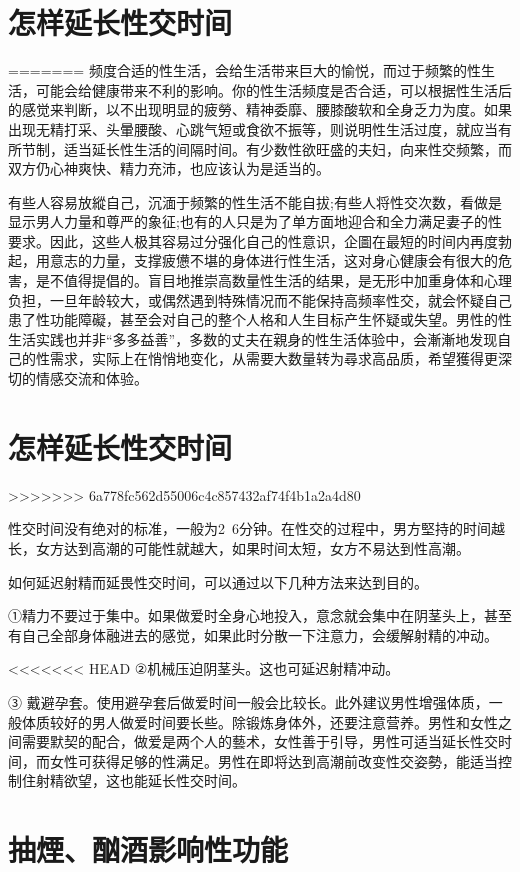 \documentclass[12pt,UTF8]{ctexbook}
\begin{document}
\section{怎样延长性交时间}
=======
频度合适的性生活，会给生活带来巨大的愉悦，而过于频繁的性生活，可能会给健康带来不利的影响。你的性生活频度是否合适，可以根据性生活后的感觉来判断，以不出现明显的疲勞、精神委靡、腰膝酸软和全身乏力为度。如果出现无精打采、头暈腰酸、心跳气短或食欲不振等，则说明性生活过度，就应当有所节制，适当延长性生活的间隔时间。有少数性欲旺盛的夫妇，向来性交频繁，而双方仍心神爽快、精力充沛，也应该认为是适当的。

有些人容易放縱自己，沉湎于频繁的性生活不能自拔;有些人将性交次数，看做是显示男人力量和尊严的象征;也有的人只是为了单方面地迎合和全力满足妻子的性要求。因此，这些人极其容易过分强化自己的性意识，企圖在最短的时间内再度勃起，用意志的力量，支撑疲憊不堪的身体进行性生活，这对身心健康会有很大的危害，是不值得提倡的。盲目地推崇高数量性生活的结果，是无形中加重身体和心理负担，一旦年龄较大，或偶然遇到特殊情况而不能保持高频率性交，就会怀疑自己患了性功能障礙，甚至会对自己的整个人格和人生目标产生怀疑或失望。男性的性生活实践也并非“多多益善”，多数的丈夫在親身的性生活体验中，会漸漸地发现自己的性需求，实际上在悄悄地变化，从需要大数量转为尋求高品质，希望獲得更深切的情感交流和体验。

\section{怎样延长性交时间}
>>>>>>> 6a778fc562d55006c4c857432af74f4b1a2a4d80

性交时间没有绝对的标准，一般为2~6分钟。在性交的过程中，男方堅持的时间越长，女方达到高潮的可能性就越大，如果时间太短，女方不易达到性高潮。

如何延迟射精而延畏性交时间，可以通过以下几种方法来达到目的。

①精力不要过于集中。如果做爱时全身心地投入，意念就会集中在阴茎头上，甚至有自己全部身体融进去的感觉，如果此时分散一下注意力，会缓解射精的冲动。

<<<<<<< HEAD
②机械压迫阴茎头。这也可延迟射精冲动。

③ 戴避孕套。使用避孕套后做爱时间一般会比较长。此外建议男性增强体质，一般体质较好的男人做爱时间要长些。除锻炼身体外，还要注意营养。男性和女性之间需要默契的配合，做爱是两个人的藝术，女性善于引导，男性可适当延长性交时间，而女性可获得足够的性满足。男性在即将达到高潮前改变性交姿勢，能适当控制住射精欲望，这也能延长性交时间。

\section{抽煙、酗酒影响性功能}
\end{document}
